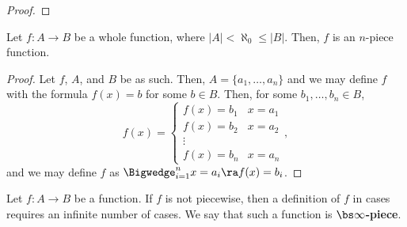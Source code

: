 \documentclass[12pt]{article}
\begin{document}
\begin{proof}
    \end{proof}

    \begin{theorem}
        Let $f:A \to B$ be a whole function, where $|A| < \aleph_0 \le |B|$. Then, $f$ is an $n$-piece function. 
    \end{theorem}
    \begin{proof}
        Let $f$, $A$, and $B$ be as such. Then, $A = \{a_1,\dots,a_n\}$ and we may define $f$ with the formula $f(x) = b$ for some $b \in B$. Then, for some $b_1,\dots,b_n \in B$, 
        \[
            f(x) = 
            \begin{cases}
                f(x) = b_1 & x = a_1 \\
                f(x) = b_2 & x = a_2 \\
                \vdots \\
                f(x) = b_n & x = a_n
            \end{cases}, 
        \]
        and we may define $f$ as $\Bigwedge_{i = 1}^n x = a_i \ra f(x) = b_i$. 
    \end{proof}

    \begin{definition}
        Let $f:A \to B$ be a function. If $f$ is not piecewise, then a definition of $f$ in cases requires an infinite number of cases. We say that such a function is $\bs\infty$\textbf{-piece}. 
    \end{definition}
\end{document}
